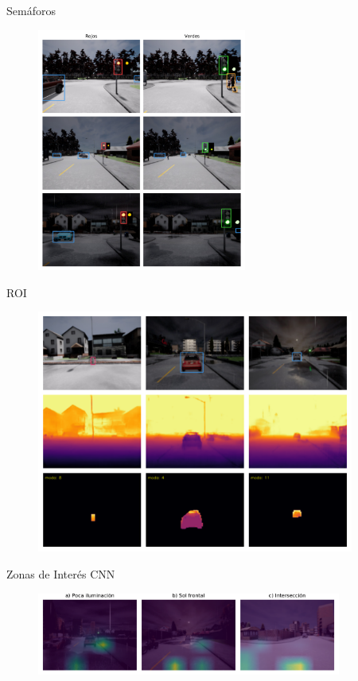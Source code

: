 \documentclass[10pt, usepdftitle=false]{beamer}
\begin{document}
\begin{frame}[fragile]{Semáforos}
%	
	\begin{figure}[H]
		\captionsetup{labelformat=empty}
		\centering
		\includegraphics[height=8cm]{imagenes/preds/semaforos}
	\end{figure}
\end{frame}

\begin{frame}[fragile]{ROI}
%	
	\begin{figure}[H]
		\captionsetup{labelformat=empty}
		\centering
		\includegraphics[height=8cm]{imagenes/preds/distance}
	\end{figure}
\end{frame}

\begin{frame}[fragile]{Zonas de Interés CNN}
%	
	\begin{figure}[H]
		\captionsetup{labelformat=empty}
		\centering
		\includegraphics[width=10cm]{imagenes/preds/scorecam}
	\end{figure}
\end{frame}
\end{document}

